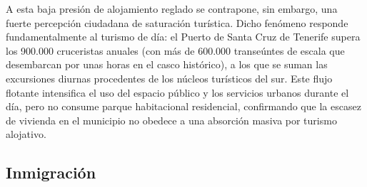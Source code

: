 
A esta baja presión de alojamiento reglado se contrapone, sin embargo, una fuerte percepción ciudadana de saturación turística.
Dicho fenómeno responde fundamentalmente al turismo de día:
el Puerto de Santa Cruz de Tenerife supera los 900.000 cruceristas anuales (con más de 600.000 transeúntes de escala que desembarcan por unas horas en el casco histórico),
a los que se suman las excursiones diurnas procedentes de los núcleos turísticos del sur.
Este flujo flotante intensifica el uso del espacio público y los servicios urbanos durante el día, pero no consume parque habitacional residencial,
confirmando que la escasez de vivienda en el municipio no obedece a una absorción masiva por turismo alojativo.

\subsection{Inmigración}

